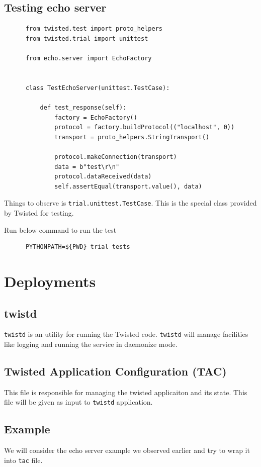 \documentclass{article}
\begin{document}
    \subsection{Testing echo server}
      \begin{verbatim}
      from twisted.test import proto_helpers
      from twisted.trial import unittest

      from echo.server import EchoFactory


      class TestEchoServer(unittest.TestCase):

          def test_response(self):
              factory = EchoFactory()
              protocol = factory.buildProtocol(("localhost", 0))
              transport = proto_helpers.StringTransport()

              protocol.makeConnection(transport)
              data = b"test\r\n"
              protocol.dataReceived(data)
              self.assertEqual(transport.value(), data)
    \end{verbatim}

    Things to observe is \texttt{trial.unittest.TestCase}. This is the special
    class provided by Twisted for testing.

    Run below command to run the test
    \begin{verbatim}
      PYTHONPATH=${PWD} trial tests
    \end{verbatim}

  \section{Deployments}

    \subsection{twistd}
      \texttt{twistd} is an utility for running the Twisted code.
      \texttt{twistd} will manage facilities like logging and running the
      service in daemonize mode.

    \subsection{Twisted Application Configuration (TAC)}
      This file is responsible for managing the twisted applicaiton and its
      state. This file will be given as input to \texttt{twistd} application.

    \subsection{Example}
      We will consider the echo server example we observed earlier and try to
      wrap it into \texttt{tac} file.
\end{document}
